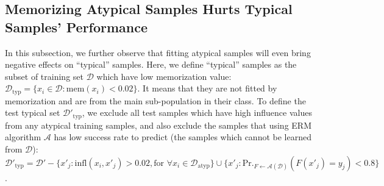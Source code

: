 \vspace{-0.2cm}
\subsection{Memorizing Atypical Samples Hurts Typical Samples' Performance}\label{sec:pre2}
\vspace{-0.2cm}


In this subsection, we further observe that fitting atypical samples will even bring negative effects on ``typical'' samples. Here, we define ``typical'' samples as the subset of training set $\mathcal{D}$ which have low memorization value: $\mathcal{D}_\text{typ} = \{x_i\in\mathcal{D}:\text{mem}(x_i)<0.02\}$. It means that they are not fitted by memorization and are from the main sub-population in their class. To define the test typical set $\mathcal{D}'_\text{typ}$, we exclude all test samples which have high influence values from any atypical training samples, and also exclude the samples that using ERM algorithm $\mathcal{A}$ has low success rate to predict (the samples which cannot be learned from $\mathcal{D}$): $\mathcal{D}'_\text{typ} = \mathcal{D}' - \{x'_j: \text{infl}(x_i,x'_j)> 0.02, \text{for } \forall x_i\in \mathcal{D}_\text{atyp}\} \cup \{x'_j: \text{Pr.}_{F\leftarrow\mathcal{A}(\mathcal{D})}(F(x'_j) = y_j) < 0.8\}$.

